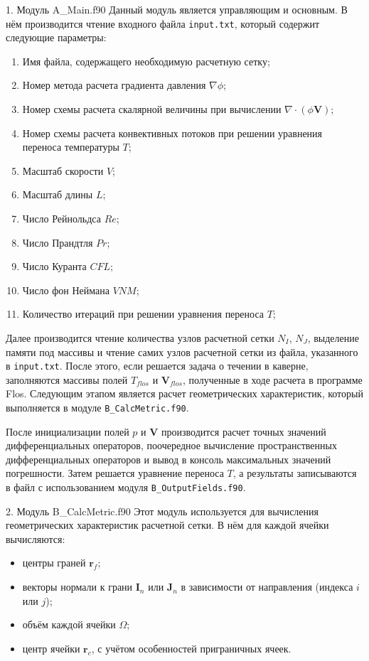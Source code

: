 {1. Модуль A\_Main.f90}
Данный модуль является управляющим и основным. В нём производится чтение входного файла \texttt{input.txt}, который содержит следующие параметры:
\begin{enumerate}
    \item Имя файла, содержащего необходимую расчетную сетку;
    \item Номер метода расчета градиента давления $\nabla \phi$;
    \item Номер схемы расчета скалярной величины при вычислении $\nabla \cdot (\phi \mathbf{V})$;
    \item Номер схемы расчета конвективных потоков при решении уравнения переноса температуры $T$;
    \item Масштаб скорости $V$;
    \item Масштаб длины $L$;
    \item Число Рейнольдса $Re$;
    \item Число Прандтля $Pr$;
    \item Число Куранта $CFL$;
    \item Число фон Неймана $VNM$;
    \item Количество итераций при решении уравнения переноса $T$;
\end{enumerate}

Далее производится чтение количества узлов расчетной сетки $N_I$, $N_J$, выделение памяти под массивы и чтение самих узлов расчетной сетки из файла, указанного в \texttt{input.txt}. После этого, если решается задача о течении в каверне, заполняются массивы полей $T_{flos}$ и $\mathbf{V}_{flos}$, полученные в ходе расчета в программе Flos. Следующим этапом является расчет геометрических характеристик, который выполняется в модуле \texttt{B\_CalcMetric.f90}.

После инициализации полей $p$ и $\mathbf{V}$ производится расчет точных значений дифференциальных операторов, поочередное вычисление пространственных дифференциальных операторов и вывод в консоль максимальных значений погрешности. Затем решается уравнение переноса $T$, а результаты записываются в файл с использованием модуля \texttt{B\_OutputFields.f90}.

{2. Модуль B\_CalcMetric.f90}
Этот модуль используется для вычисления геометрических характеристик расчетной сетки. В нём для каждой ячейки вычисляются:
\begin{itemize}
    \item центры граней $\mathbf{r}_f$;
    \item векторы нормали к грани $\mathbf{I}_n$ или $\mathbf{J}_n$ в зависимости от направления (индекса $i$ или $j$);
    \item объём каждой ячейки $\Omega$;
    \item центр ячейки $\mathbf{r}_c$, с учётом особенностей приграничных ячеек.
\end{itemize}

